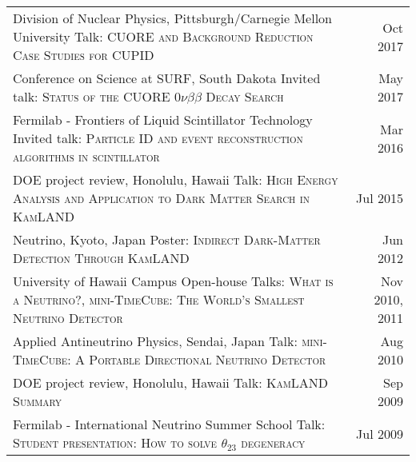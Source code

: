 \documentclass[10pt]{article} %
\begin{document}
\noindent\begin{tabularx}{\linewidth}{@{{}\textbullet\enskip}X@{\quad}r@{}}
	Division of Nuclear Physics, Pittsburgh/Carnegie Mellon University \newline Talk: \textsc{CUORE and Background Reduction Case Studies for CUPID} & Oct 2017 \\
	Conference on Science at SURF, South Dakota \newline Invited talk: \textsc{Status of the CUORE $0\nu\beta\beta$ Decay Search} & May 2017 \\
	Fermilab - Frontiers of Liquid Scintillator Technology \newline Invited talk: \textsc{Particle ID and event reconstruction algorithms in scintillator} & Mar 2016 \\
	DOE project review, Honolulu, Hawaii \newline Talk: \textsc{High Energy Analysis and Application to Dark Matter Search in KamLAND} & Jul 2015 \\
	Neutrino, Kyoto, Japan \newline Poster: \textsc{Indirect Dark-Matter Detection Through KamLAND} & Jun 2012 \\
	University of Hawaii Campus Open-house \newline Talks: \textsc{What is a Neutrino?}, \textsc{mini-TimeCube: The World's Smallest Neutrino Detector} & Nov 2010, 2011 \\
	Applied Antineutrino Physics, Sendai, Japan \newline Talk: \textsc{mini-TimeCube: A Portable Directional Neutrino Detector} & Aug 2010 \\
	DOE project review, Honolulu, Hawaii \newline Talk: \textsc{KamLAND Summary} & Sep 2009 \\
	Fermilab - International Neutrino Summer School \newline Talk: \textsc{Student presentation: How to solve $\theta_{23}$ degeneracy} & Jul 2009 \\
\end{tabularx}


\renewcommand\refname{Publications} %

\nocite{*} %
%
\end{document}
